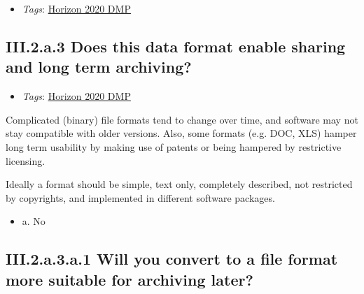 \documentclass[a4paper,12pt]{report}
\begin{document}
\begin{itemize}
  \item \textit{Tags}: \ul{Horizon 2020 DMP}
  \end{itemize}





\subsection*{\protect\textcolor{colorSecId}{III.2.a.3} Does this data format enable sharing and long term archiving?}

\label{b1df3c74-0b1f-4574-81c4-4cc2d780c1af.b08fe063-33f8-4380-b3a9-ba1e586dedf2.df7ff410-748e-4704-b5b4-a06c4b269047.ced5a7c2-4034-4763-a1d5-3cb815cdfddb}


\begin{itemize}
  \item \textit{Tags}: \ul{Horizon 2020 DMP}
  \end{itemize}


\noindent
\begin{markdown}
Complicated (binary) file formats tend to change over time, and software may not stay compatible with older versions. Also, some formats (e.g. DOC, XLS) hamper long term usability by making use of patents or being hampered by restrictive licensing. 

Ideally a format should be simple, text only, completely described, not restricted by copyrights, and implemented in different software packages.
\end{markdown}



\begin{itemize}
  \item[\CheckmarkBold] a. No
\end{itemize}




\subsection*{\protect\textcolor{colorSecId}{III.2.a.3.a.1} Will you convert to a file format more suitable for archiving later?}

\label{b1df3c74-0b1f-4574-81c4-4cc2d780c1af.b08fe063-33f8-4380-b3a9-ba1e586dedf2.df7ff410-748e-4704-b5b4-a06c4b269047.ced5a7c2-4034-4763-a1d5-3cb815cdfddb.86e547b8-e3ae-44b2-89ad-3a0d67decc56.bf32374c-b24e-4b03-9898-a753cff56fcf}
\end{document}
